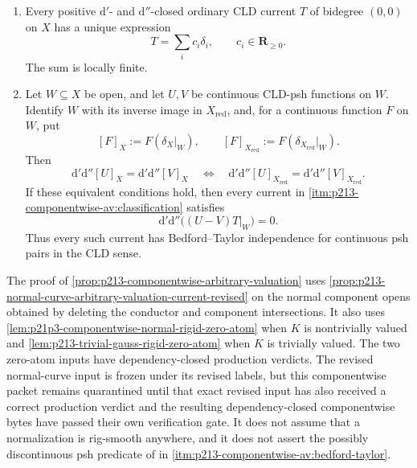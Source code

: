 \begin{proposition}
\begin{enumerate}
\item\label{itm:p213-componentwise-av:classification}
Every positive $\mathrm d'$- and $\mathrm d''$-closed ordinary CLD current
$T$ of bidegree $(0,0)$ on $X$ has a unique expression
\begin{equation}
 \label{eq:p213-componentwise-av-classification}
                         T=\sum_i c_i\delta_i,
                         \qquad c_i\in\mathbf R_{\geq0}.
\end{equation}
The sum is locally finite.

\item\label{itm:p213-componentwise-av:bedford-taylor}
Let $W\subseteq X$ be open, and let $U,V$ be continuous CLD-psh functions
on $W$.  Identify $W$ with its inverse image in $X_{\mathrm{red}}$, and,
for a continuous function $F$ on $W$, put
\[
 [F]_X:=F(\delta_X|_W),
 \qquad
 [F]_{X_{\mathrm{red}}}:=
      F(\delta_{X_{\mathrm{red}}}|_W).
\]
Then
\begin{equation}
 \label{eq:p213-componentwise-av-curvature-equivalence}
 \mathrm d'\mathrm d''[U]_X=\mathrm d'\mathrm d''[V]_X
 \quad\Longleftrightarrow\quad
 \mathrm d'\mathrm d''[U]_{X_{\mathrm{red}}}
  =\mathrm d'\mathrm d''[V]_{X_{\mathrm{red}}}.
\end{equation}
If these equivalent conditions hold, then every current in
\cref{itm:p213-componentwise-av:classification} satisfies
\begin{equation}
 \label{eq:p213-componentwise-av-bt-conclusion}
             \mathrm d'\mathrm d''\bigl((U-V)T|_W\bigr)=0.
\end{equation}
Thus every such current has Bedford--Taylor independence for continuous
psh pairs in the CLD sense.
\end{enumerate}
\end{proposition}

\begin{remark}
\label{rem:p213-componentwise-av-scope}
The proof of
\cref{prop:p213-componentwise-arbitrary-valuation} uses
\cref{prop:p213-normal-curve-arbitrary-valuation-current-revised} on the normal
component opens obtained by deleting the conductor and component
intersections.  It also uses
\cref{lem:p21p3-componentwise-normal-rigid-zero-atom} when $K$ is
nontrivially valued and
\cref{lem:p213-trivial-gauss-rigid-zero-atom} when $K$ is trivially
valued.  The two zero-atom inputs have dependency-closed production verdicts.
The revised normal-curve input is frozen under its revised labels, but this
componentwise packet remains quarantined until that exact revised input has
also received a correct production verdict and the resulting dependency-closed
componentwise bytes have passed their own verification gate.
It does not assume that a normalization is rig-smooth anywhere, and it
does not assert the possibly discontinuous psh predicate of
\cite[Definition~8.6.2]{CLD25} in
\cref{itm:p213-componentwise-av:bedford-taylor}.
\end{remark}
